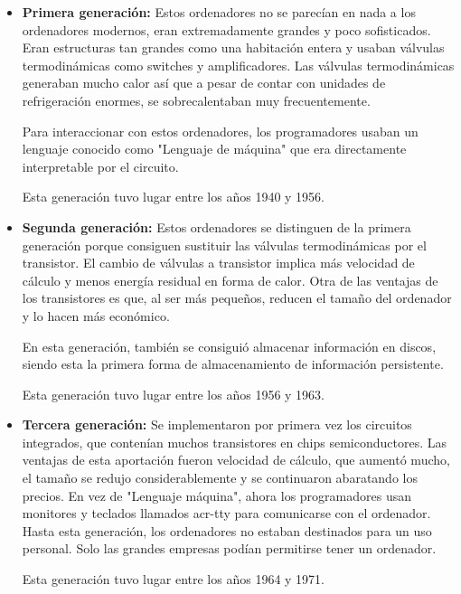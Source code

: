 \documentclass[titlepage, 12pt, a4paper]{article}
\begin{document}
\begin{itemize}
	\item{\textbf{Primera generación: }}Estos ordenadores no se parecían en nada a los ordenadores modernos, eran extremadamente grandes y poco sofisticados. Eran estructuras tan grandes como una habitación entera y usaban válvulas termodinámicas como switches y amplificadores. Las válvulas termodinámicas generaban mucho calor así que a pesar de contar con unidades de refrigeración enormes, se sobrecalentaban muy frecuentemente.\par Para interaccionar con estos ordenadores, los programadores usaban un lenguaje conocido como "Lenguaje de máquina" que era directamente interpretable por el circuito.\par Esta generación tuvo lugar entre los años 1940 y 1956.
	\item{\textbf{Segunda generación: }}Estos ordenadores se distinguen de la primera generación porque consiguen sustituir las válvulas termodinámicas por el  transistor. El cambio de válvulas a transistor implica más velocidad de cálculo y menos energía residual en forma de calor. Otra de las ventajas de los transistores es que, al ser más pequeños, reducen el tamaño del ordenador y lo hacen más económico.\par En esta generación, también se consiguió almacenar información en discos, siendo esta la primera forma de almacenamiento de información persistente.\par Esta generación tuvo lugar entre los años 1956 y 1963.
	\item{\textbf{Tercera generación: }}Se implementaron por primera vez los circuitos integrados, que contenían muchos transistores en chips semiconductores. Las ventajas de esta aportación fueron velocidad de cálculo, que aumentó mucho, el tamaño se redujo considerablemente y se continuaron abaratando los precios. En vez de "Lenguaje máquina", ahora los programadores usan monitores y teclados llamados \gls{acr-tty} para comunicarse con el ordenador. Hasta esta generación, los ordenadores no estaban destinados para un uso personal. Solo las grandes empresas podían permitirse tener un ordenador.\par Esta generación tuvo lugar entre los años 1964 y 1971.

\end{itemize}
\end{document}
